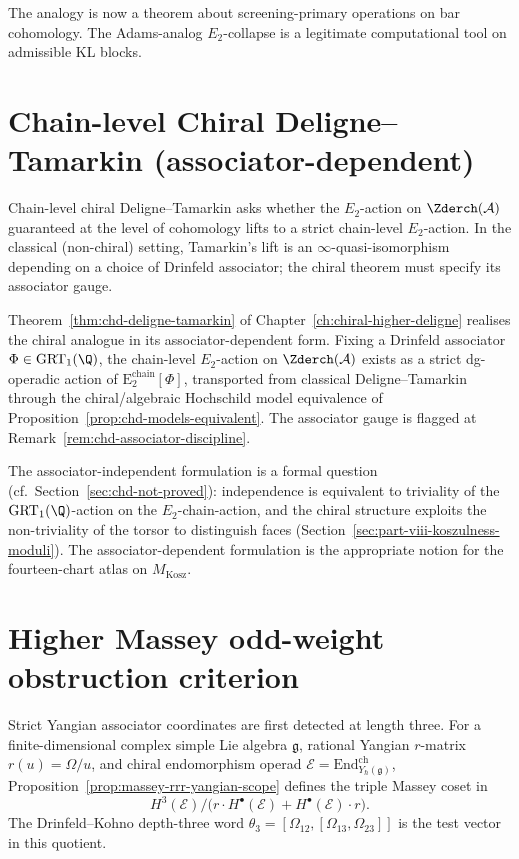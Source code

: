 The analogy is now a theorem about screening-primary operations on bar
cohomology. The Adams-analog $E_{2}$-collapse is a legitimate
computational tool on admissible KL blocks.

\section{Chain-level Chiral Deligne--Tamarkin (associator-dependent)}
\label{sec:part-viii-deligne-tamarkin}

Chain-level chiral Deligne--Tamarkin asks whether the $E_{2}$-action
on $\Zderch(\mathcal{A})$ guaranteed at the level of cohomology lifts
to a strict chain-level $E_{2}$-action. In the classical (non-chiral)
setting, Tamarkin's lift is an $\infty$-quasi-isomorphism depending on
a choice of Drinfeld associator; the chiral theorem must specify its
associator gauge.

Theorem~\ref{thm:chd-deligne-tamarkin} of
Chapter~\ref{ch:chiral-higher-deligne} realises the chiral analogue
in its associator-dependent form. Fixing a Drinfeld associator
$\Phi \in \mathrm{GRT}_{1}(\Q)$, the chain-level $E_{2}$-action on
$\Zderch(\mathcal{A})$ exists as a strict dg-operadic action of
$\mathrm{E}_{2}^{\mathrm{chain}}[\Phi]$, transported from classical
Deligne--Tamarkin through the chiral/algebraic Hochschild model
equivalence of Proposition~\ref{prop:chd-models-equivalent}.
The associator gauge is flagged at
Remark~\ref{rem:chd-associator-discipline}.

The associator-independent formulation is a formal question
(cf.\ Section~\ref{sec:chd-not-proved}): independence is equivalent
to triviality of the $\mathrm{GRT}_{1}(\Q)$-action on the
$E_{2}$-chain-action, and the chiral structure exploits the
non-triviality of the torsor to distinguish faces
(Section~\ref{sec:part-viii-koszulness-moduli}). The
associator-dependent formulation is the appropriate notion for the
fourteen-chart atlas on $M_{\mathrm{Kosz}}$.

\section{Higher Massey odd-weight obstruction criterion}
\label{sec:part-viii-massey}

Strict Yangian associator coordinates are first detected at length
three. For a finite-dimensional complex simple Lie algebra
$\mathfrak g$, rational Yangian $r$-matrix \(r(u)=\Omega/u\), and
chiral endomorphism operad
\(\mathcal E=\mathrm{End}^{\mathrm{ch}}_{Y_\hbar(\mathfrak g)}\),
Proposition~\ref{prop:massey-rrr-yangian-scope} defines the triple
Massey coset in
\[
H^3(\mathcal E)\Big/
\bigl(r\cdot H^\bullet(\mathcal E)+H^\bullet(\mathcal E)\cdot r\bigr).
\]
The Drinfeld--Kohno depth-three word
\(\theta_3=[\Omega_{12},[\Omega_{13},\Omega_{23}]]\) is the test
vector in this quotient.

